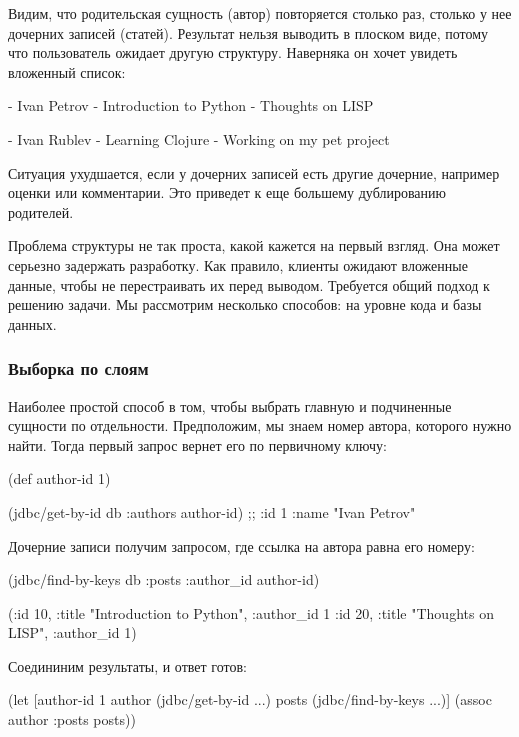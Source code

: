Видим, что родительская сущность (автор) повторяется столько раз, столько у нее дочерних записей (статей). Результат нельзя выводить в плоском виде, потому что пользователь ожидает другую структуру. Наверняка он хочет увидеть вложенный список:

- Ivan Petrov
  - Introduction to Python
  - Thoughts on LISP

- Ivan Rublev
  - Learning Clojure
  - Working on my pet project

Ситуация ухудшается, если у дочерних записей есть другие дочерние, например оценки или комментарии. Это приведет к еще большему дублированию родителей.

Проблема структуры не так проста, какой кажется на первый взгляд. Она может серьезно задержать разработку. Как правило, клиенты ожидают вложенные данные, чтобы не перестраивать их перед выводом. Требуется общий подход к решению задачи. Мы рассмотрим несколько способов: на уровне кода и базы данных.

\subsubsection{Выборка по слоям}

Наиболее простой способ в том, чтобы выбрать главную и подчиненные сущности по отдельности. Предположим, мы знаем номер автора, которого нужно найти. Тогда первый запрос вернет его по первичному ключу:

\begin{english}
  \begin{clojure}
(def author-id 1)

(jdbc/get-by-id db :authors author-id)
;; {:id 1 :name "Ivan Petrov"}
  \end{clojure}
\end{english}

Дочерние записи получим запросом, где ссылка на автора равна его номеру:

\begin{english}
  \begin{clojure}
(jdbc/find-by-keys db :posts {:author_id author-id})

({:id 10, :title "Introduction to Python", :author_id 1}
 {:id 20, :title "Thoughts on LISP", :author_id 1})
  \end{clojure}
\end{english}

Соедининим результаты, и ответ готов:

\begin{english}
  \begin{clojure}
(let [author-id 1
      author (jdbc/get-by-id ...)
      posts (jdbc/find-by-keys ...)]
  (assoc author :posts posts))
  \end{clojure}
\end{english}


